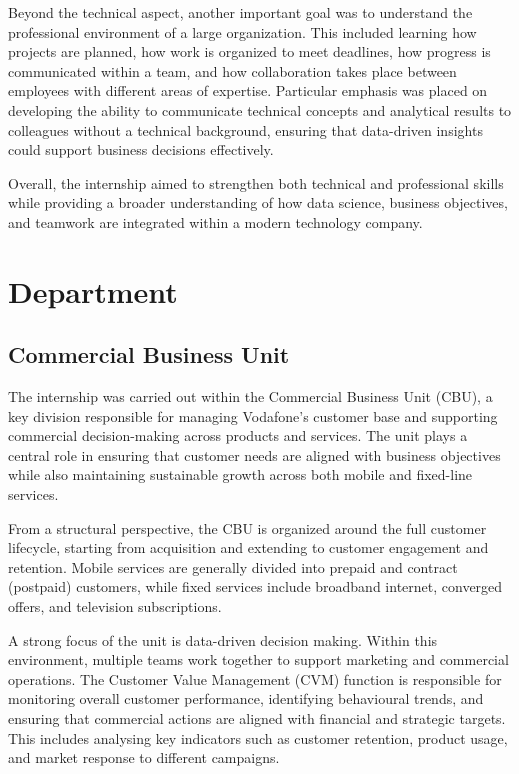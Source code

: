 \documentclass[12pt, a4paper, oneside]{report}
\begin{document}
Beyond the technical aspect, another important goal was to understand the professional environment of a large organization. This included learning how projects are planned, how work is organized to meet deadlines, how progress is communicated within a team, and how collaboration takes place between employees with different areas of expertise. Particular emphasis was placed on developing the ability to communicate technical concepts and analytical results to colleagues without a technical background, ensuring that data-driven insights could support business decisions effectively.

Overall, the internship aimed to strengthen both technical and professional skills while providing a broader understanding of how data science, business objectives, and teamwork are integrated within a modern technology company.


\section{Department}
\subsection{Commercial Business Unit}
The internship was carried out within the Commercial Business Unit (CBU), a key division responsible for managing Vodafone’s customer base and supporting commercial decision-making across products and services. The unit plays a central role in ensuring that customer needs are aligned with business objectives while also maintaining sustainable growth across both mobile and fixed-line services.

From a structural perspective, the CBU is organized around the full customer lifecycle, starting from acquisition and extending to customer engagement and retention. Mobile services are generally divided into prepaid and contract (postpaid) customers, while fixed services include broadband internet, converged offers, and television subscriptions.


A strong focus of the unit is data-driven decision making. Within this environment, multiple teams work together to support marketing and commercial operations. The Customer Value Management (CVM) function is responsible for monitoring overall customer performance, identifying behavioural trends, and ensuring that commercial actions are aligned with financial and strategic targets. This includes analysing key indicators such as customer retention, product usage, and market response to different campaigns.
\end{document}
